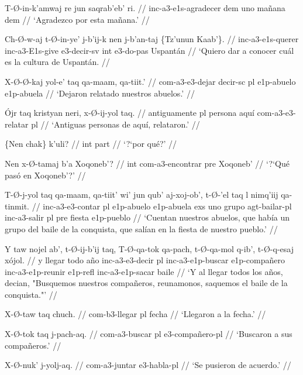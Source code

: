 \documentclass[12pt]{article}
\begin{document}
\ex
\begingl
  \gla  T-\O-in-k'amwaj re jun saqrab'eb' ri. //
  \glb inc-a3-e1s-agradecer dem uno ma\~nana dem //
  \glft `Agradezco por esta ma\~nana.' //
\endgl
\xe

\ex
\begingl
  \gla  Ch-\O-w-aj t-\O-in-ye' j-b'ij-k nen j-b'an-taj \{Tz'unun Kaab'\}. //
  \glb inc-a3-e1s-querer inc-a3-E1s-give e3-decir-sv int e3-do-pas Uspant\'an //
  \glft `Quiero dar a conocer cu\'al es la cultura de Uspant\'an. //
\endgl
\xe

\ex
\begingl
  \gla  X-\O-\O-kaj yol-e' taq qa-maam, qa-tiit.' //
  \glb com-a3-e3-dejar decir-sc pl e1p-abuelo e1p-abuela //
  \glft `Dejaron relatado nuestros abuelos.' //
\endgl
\xe

\ex
\begingl
  \gla \'Ojr taq kristyan neri, x-\O-ij-yol taq. //
  \glb  antiguamente pl persona aqu\'i com-a3-e3-relatar pl //
  \glft `Antiguas personas de aqu\'i, relataron.' //
\endgl
\xe


\ex
\begingl
  \gla  \{Nen chak\} k'uli? //
  \glb int part //
  \glft `?`por qu\'e?' //
\endgl
\xe

\ex
\begingl
  \gla  Nen x-\O-tamaj b'a Xoqoneb'? //
  \glb int com-a3-encontrar pre Xoqoneb' //
  \glft `?`Qu\'e pas\'o en Xoqoneb'?' //
\endgl
\xe

\ex
\begingl
  \gla  T-\O-j-yol taq qa-maam, qa-tiit' wi' jun qub' aj-xoj-ob', t-\O-'el taq l nimq'iij qa-tinmit. //
  \glb  inc-a3-e3-contar pl e1p-abuelo e1p-abuela exs uno grupo agt-bailar-pl inc-a3-salir pl pre fiesta e1p-pueblo //
  \glft `Cuentan nuestros abuelos, que hab\'ia un grupo del baile de la conquista, que sal\'ian en la fiesta de nuestro pueblo.' //
\endgl
\xe

\ex
\begingl
  \gla  Y taw nojel ab', t-\O-ij-b'ij taq, T-\O-qa-tok qa-pach, t-\O-qa-mol q-ib', t-\O-q-esaj x\'ojol. //
  \glb  y llegar todo a\~no inc-a3-e3-decir pl inc-a3-e1p-buscar e1p-compa\~nero inc-a3-e1p-reunir e1p-refl inc-a3-e1p-sacar baile //
  \glft `Y al llegar todos los a\~nos, decian, "Busquemos nuestros compa\~neros, reunamonos, saquemos el baile de la conquista."' //
\endgl
\xe


\ex
\begingl
  \gla  X-\O-taw taq chuch. //
  \glb com-b3-llegar pl fecha //
  \glft `Llegaron a la fecha.' //
\endgl
\xe

\ex
\begingl
  \gla  X-\O-tok taq j-pach-aq. //
  \glb com-a3-buscar pl e3-compa\~nero-pl //
  \glft `Buscaron a sus compa\~neros.' //
\endgl
\xe

\ex
\begingl
  \gla  X-\O-nuk' j-yolj-aq. //
  \glb  com-a3-juntar e3-habla-pl //
  \glft `Se pusieron de acuerdo.' //
\endgl
\xe
\end{document}

